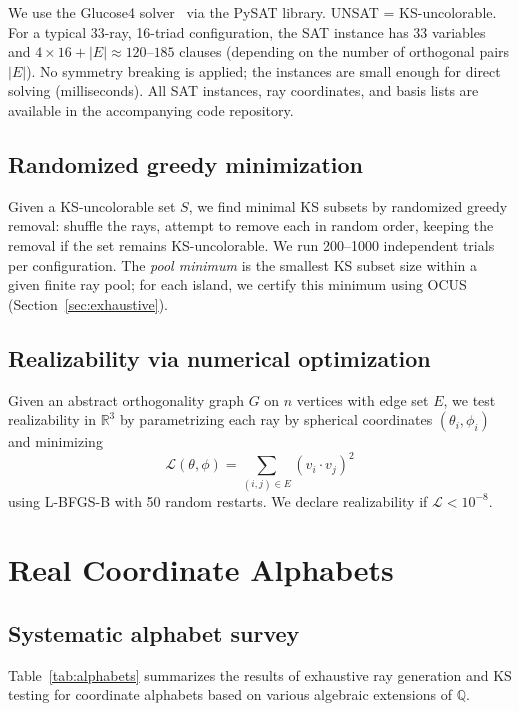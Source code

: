 \documentclass[12pt,a4paper]{article}
\newcommand{\R}{\mathbb{R}}
\newcommand{\Q}{\mathbb{Q}}
\begin{document}
We use the Glucose4 solver~\cite{AudemardSimon2018} via the PySAT library. UNSAT = KS-uncolorable. For a typical 33-ray, 16-triad configuration, the SAT instance has 33 variables and $4 \times 16 + |E| \approx 120$--$185$ clauses (depending on the number of orthogonal pairs $|E|$). No symmetry breaking is applied; the instances are small enough for direct solving (milliseconds). All SAT instances, ray coordinates, and basis lists are available in the accompanying code repository.

\subsection{Randomized greedy minimization}

Given a KS-uncolorable set $S$, we find minimal KS subsets by randomized greedy removal: shuffle the rays, attempt to remove each in random order, keeping the removal if the set remains KS-uncolorable. We run 200--1000 independent trials per configuration.  The \emph{pool minimum} is the smallest KS subset size within a given finite ray pool; for each island, we certify this minimum using OCUS (Section~\ref{sec:exhaustive}).

\subsection{Realizability via numerical optimization}

Given an abstract orthogonality graph $G$ on $n$ vertices with edge set $E$, we test realizability in $\R^3$ by parametrizing each ray by spherical coordinates $(\theta_i, \phi_i)$ and minimizing
\[
\mathcal{L}(\theta, \phi) = \sum_{(i,j) \in E} (v_i \cdot v_j)^2
\]
using L-BFGS-B with 50 random restarts. We declare realizability if $\mathcal{L} < 10^{-8}$.

\section{Real Coordinate Alphabets}\label{sec:real}

\subsection{Systematic alphabet survey}

Table~\ref{tab:alphabets} summarizes the results of exhaustive ray generation and KS testing for coordinate alphabets based on various algebraic extensions of $\Q$.
\end{document}
